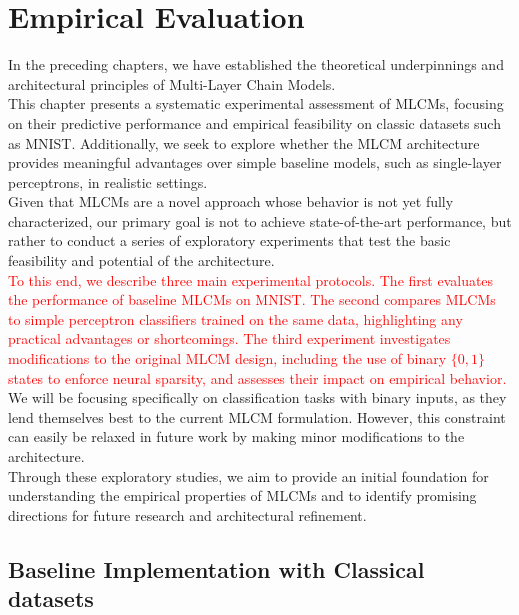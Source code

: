 \documentclass[a4paper,12pt]{report}
\begin{document}
\chapter{Empirical Evaluation}
In the preceding chapters, we have established the theoretical underpinnings and 
architectural principles of Multi-Layer Chain Models. \\
This chapter presents a systematic experimental assessment of MLCMs, focusing on their 
predictive performance and empirical feasibility on classic datasets such as MNIST. 
Additionally, we seek to explore whether the MLCM architecture provides meaningful 
advantages over simple baseline models, such as single-layer perceptrons, in 
realistic settings. \\
Given that MLCMs are a novel approach whose behavior is not yet fully 
characterized, our primary goal is not to achieve state-of-the-art performance, 
but rather to conduct a series of exploratory experiments that test the basic 
feasibility and potential of the architecture. \\
\textcolor{red}{To this end, we describe three main experimental protocols. The first evaluates the 
performance of baseline MLCMs on MNIST. The second compares MLCMs to simple 
perceptron classifiers trained on the same data, highlighting any practical 
advantages or shortcomings. The third experiment investigates modifications to the 
original MLCM design, including the use of binary \(\{0,1\}\) states to enforce 
neural sparsity, and assesses their impact on empirical behavior. \\}
We will be focusing specifically on classification tasks with binary inputs, as they 
lend themselves best to the current MLCM formulation. However, this constraint can 
easily be relaxed in future work by making minor modifications to the architecture. \\
Through these exploratory studies, we aim to provide an initial foundation for 
understanding the empirical properties of MLCMs and to identify promising directions 
for future research and architectural refinement.

\section{Baseline Implementation with Classical datasets}
\end{document}
